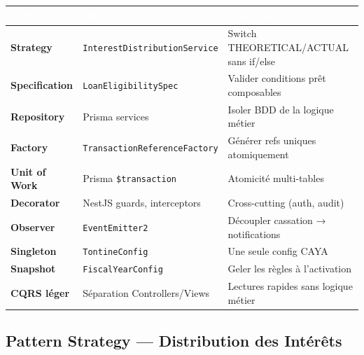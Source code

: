 \documentclass[12pt, a4paper]{report}
\begin{document}
\begin{center}
\begin{tabular}{L{3.5cm}L{4cm}L{6cm}}
  \toprule
  \textcolor{white}{\textbf{Pattern}} &
  \textcolor{white}{\textbf{Où}} &
  \textcolor{white}{\textbf{Pourquoi}} \\
  \midrule
  \textbf{Strategy}        & \texttt{InterestDistributionService} & Switch THEORETICAL/ACTUAL sans if/else \\
  \textbf{Specification}   & \texttt{LoanEligibilitySpec}         & Valider conditions prêt composables \\
  \textbf{Repository}      & Prisma services                      & Isoler BDD de la logique métier \\
  \textbf{Factory}         & \texttt{TransactionReferenceFactory} & Générer refs uniques atomiquement \\
  \textbf{Unit of Work}    & Prisma \texttt{\$transaction}        & Atomicité multi-tables \\
  \textbf{Decorator}       & NestJS guards, interceptors          & Cross-cutting (auth, audit) \\
  \textbf{Observer}        & \texttt{EventEmitter2}               & Découpler cassation → notifications \\
  \textbf{Singleton}       & \texttt{TontineConfig}               & Une seule config CAYA \\
  \textbf{Snapshot}        & \texttt{FiscalYearConfig}            & Geler les règles à l'activation \\
  \textbf{CQRS léger}      & Séparation Controllers/Views         & Lectures rapides sans logique métier \\
  \bottomrule
\end{tabular}
\end{center}

\subsection{Pattern Strategy — Distribution des Intérêts}
\end{document}

